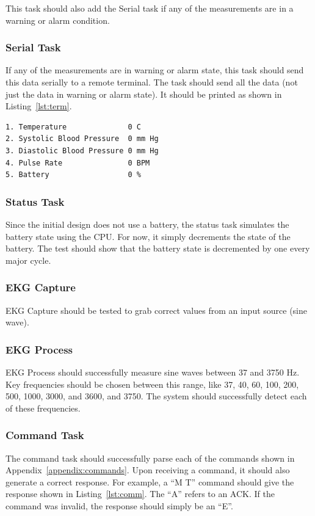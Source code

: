 \documentclass[12pt]{article} %
\begin{document}
    This task should also add the Serial task if any of the measurements are in
    a warning or alarm condition.

    \subsubsection{Serial Task}
    If any of the measurements are in warning or alarm state, this task should
    send this data serially to a remote terminal.  The task should send all the
    data (not just the data in warning or alarm state).  It should be printed as
    shown in Listing~\ref{lst:term}.\\

\begin{lstlisting}[caption=Remote Terminal Output, captionpos=b, label=lst:term]
1. Temperature              0 C
2. Systolic Blood Pressure  0 mm Hg
3. Diastolic Blood Pressure 0 mm Hg
4. Pulse Rate               0 BPM
5. Battery                  0 % 
\end{lstlisting}

    \subsubsection{Status Task} Since the initial design does not use a
    battery, the status task simulates the battery state using the CPU. For
    now, it simply decrements the state of the battery. The test should show
    that the battery state is decremented by one every major cycle.

    \subsubsection{EKG Capture} EKG Capture should be tested to grab correct
    values from an input source (sine wave).  

    \subsubsection{EKG Process} EKG Process should successfully measure sine
    waves between 37 and 3750 Hz.  Key frequencies should be chosen between this
    range, like 37, 40, 60, 100, 200, 500, 1000, 3000, and 3600, and 3750.  The
    system should successfully detect each of these frequencies.

    \subsubsection{Command Task} The command task should successfully parse
    each of the commands shown in Appendix~\ref{appendix:commands}.  Upon
    receiving a command, it should also generate a correct response.  For
    example, a ``M T'' command should give the response shown in Listing~\ref{lst:comm}.
    The ``A'' refers to an ACK.  If the command was invalid, the response should simply
    be an ``E''.
\end{document}
